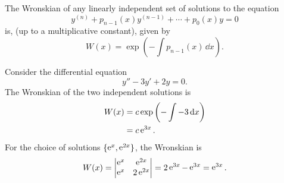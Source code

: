 \begin{Result}
  The Wronskian of any linearly independent set of solutions to the equation
  \[ 
  y^{(n)} + p_{n-1}(x) y^{(n-1)} + \cdots + p_0(x) y = 0 
  \]
  is, (up to a multiplicative constant), given by
  \[
  W(x) = \exp \left( -\int p_{n-1}(x)\,\dd x \right). 
  \]
\end{Result}




\begin{Example}
  Consider the differential equation
  \[
  y'' -3y' + 2y = 0. 
  \]
  The Wronskian of the two independent solutions is
  \begin{align*}
    W(x)    &= c \exp \left( - \int -3\,\mathrm{d} x \right) \\
    &= c \mathop{\mathrm{e}}\nolimits^{3 x}.
  \end{align*}
  For the choice of solutions $\{\mathop{\mathrm{e}}\nolimits^x, \mathop{\mathrm{e}}\nolimits^{2x}\}$, the Wronskian is
  \[ W(x) = 
  \begin{vmatrix}
    \mathop{\mathrm{e}}\nolimits^x     &       \mathop{\mathrm{e}}\nolimits^{2x}  \\
    \mathop{\mathrm{e}}\nolimits^x     &       2\mathop{\mathrm{e}}\nolimits^{2x}
  \end{vmatrix}
  = 2\mathop{\mathrm{e}}\nolimits^{3x} - \mathop{\mathrm{e}}\nolimits^{3x} = \mathop{\mathrm{e}}\nolimits^{3x}.
  \]
\end{Example}









